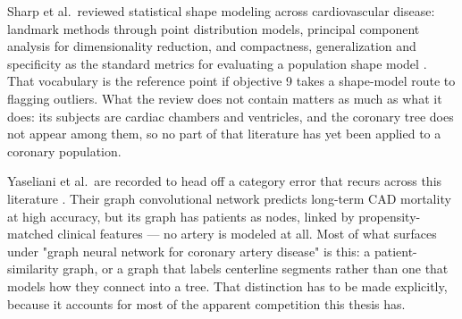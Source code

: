 Sharp et al.\ reviewed statistical shape modeling across cardiovascular disease: landmark methods
through point distribution models, principal component analysis for dimensionality reduction, and
compactness, generalization and specificity as the standard metrics for evaluating a population shape
model \cite{sharp2026ssm}.
That vocabulary is the reference point if objective 9 takes a shape-model route to flagging outliers.
What the review does not contain matters as much as what it does: its subjects are cardiac chambers
and ventricles, and the coronary tree does not appear among them, so no part of that literature has
yet been applied to a coronary population.

Yaseliani et al.\ are recorded to head off a category error that recurs across this literature
\cite{yaseliani2025gnn}.
Their graph convolutional network predicts long-term CAD mortality at high accuracy, but its graph
has patients as nodes, linked by propensity-matched clinical features --- no artery is modeled at
all.
Most of what surfaces under "graph neural network for coronary artery disease" is this: a
patient-similarity graph, or a graph that labels centerline segments rather than one that models how
they connect into a tree.
That distinction has to be made explicitly, because it accounts for most of the apparent competition
this thesis has.
